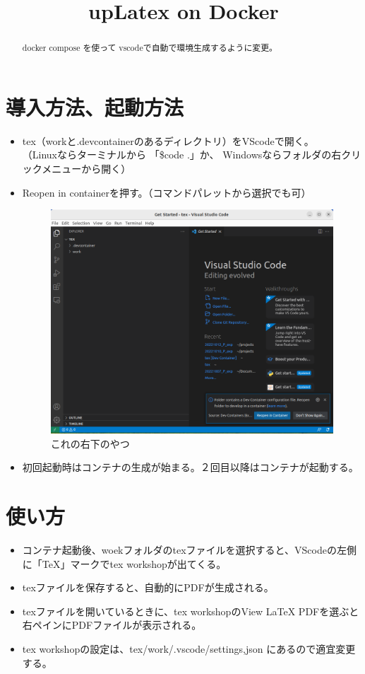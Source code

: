 \documentclass[uplatex]{jsarticle}
\title{upLatex on Docker}
\begin{document}
\maketitle

\begin{abstract}
  docker compose を使って vscodeで自動で環境生成するように変更。
\end{abstract}

\section{導入方法、起動方法}
\begin{itemize}
\item  tex（workと.devcontainerのあるディレクトリ）をVScodeで開く。  \\
（Linuxならターミナルから 「\$code .」か、 Windowsならフォルダの右クリックメニューから開く）

\item Reopen in containerを押す。（コマンドパレットから選択でも可）

\begin{figure}[H]
  \centering
  \includegraphics[width=0.7 \linewidth]{imgs/reopen_in_container.png}
  \caption{これの右下のやつ}
\end{figure}

\item 初回起動時はコンテナの生成が始まる。２回目以降はコンテナが起動する。
\end{itemize}

\section{使い方}
\begin{itemize}
\item コンテナ起動後、woekフォルダのtexファイルを選択すると、VScodeの左側に「TeX」マークでtex workshopが出てくる。
\item texファイルを保存すると、自動的にPDFが生成される。
\item texファイルを開いているときに、tex workshopのView LaTeX PDFを選ぶと右ペインにPDFファイルが表示される。
\item tex workshopの設定は、tex/work/.vscode/settings,json にあるので適宜変更する。
\end{itemize}
\end{document}
